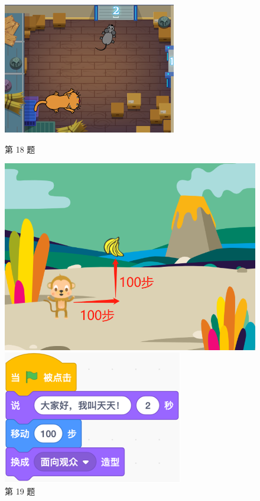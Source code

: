 \documentclass[10pt, a4paper]{article}
\begin{document}
\begin{enumerate}
        \begin{figure}[htbp]
            \begin{minipage}[t]{.2\textwidth}
                \centering
                \includegraphics[width=.85\textwidth]{18.png}
                \caption*{第 18 题}
            \end{minipage}
            \begin{minipage}[t]{.2\textwidth}
                \centering
                \includegraphics[width=.88\textwidth]{19.png}
                \caption*{第 19 题}
            \end{minipage}
            \begin{minipage}[t]{.24\textwidth}
                \centering
                \includegraphics[width=.7\textwidth]{20.png}

\end{minipage}
\end{figure}
\end{enumerate}
\end{document}
